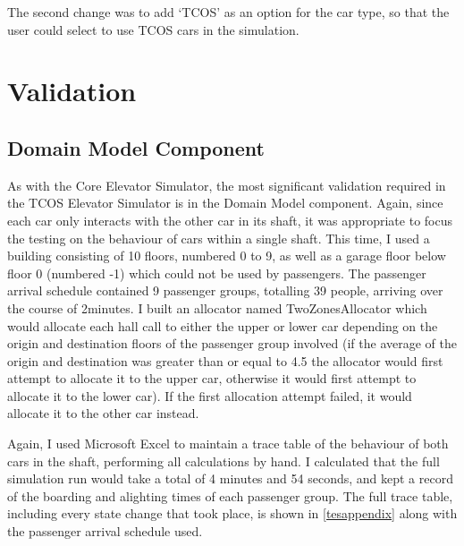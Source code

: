 \documentclass{UoYCSproject}
\begin{document}
The second change was to add `TCOS' as an option for the car type, so that the user could select to use TCOS cars in the simulation.

\section{Validation}

\subsection{Domain Model Component}
As with the Core Elevator Simulator, the most significant validation required in the TCOS Elevator Simulator is in the Domain Model component.  Again, since each car only interacts with the other car in its shaft, it was appropriate to focus the testing on the behaviour of cars within a single shaft.  This time, I used a building consisting of 10 floors, numbered 0 to 9, as well as a garage floor below floor 0 (numbered -1) which could not be used by passengers.  The passenger arrival schedule contained 9 passenger groups, totalling 39 people, arriving over the course of 2\textonehalf minutes.  I built an allocator named TwoZonesAllocator which would allocate each hall call to either the upper or lower car depending on the origin and destination floors of the passenger group involved (if the average of the origin and destination was greater than or equal to 4.5 the allocator would first attempt to allocate it to the upper car, otherwise it would first attempt to allocate it to the lower car).  If the first allocation attempt failed, it would allocate it to the other car instead.

Again, I used Microsoft Excel to maintain a trace table of the behaviour of both cars in the shaft, performing all calculations by hand.  I calculated that the full simulation run would take a total of 4 minutes and 54 seconds, and kept a record of the boarding and alighting times of each passenger group.  The full trace table, including every state change that took place, is shown in \autoref{tesappendix} along with the passenger arrival schedule used.
\end{document}
